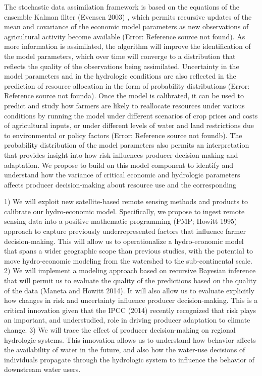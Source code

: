 The stochastic data assimilation framework is based on the equations of the ensemble Kalman filter (Evensen 2003) , which permits recursive updates of the mean and covariance of the economic model parameters as new observations of agricultural activity become available (Error: Reference source not found).  As more information is assimilated, the algorithm will improve the identification of the model parameters, which over time will converge to a distribution that reflects the quality of the observations being assimilated. Uncertainty in the model parameters and in the hydrologic conditions are also reflected in the prediction of resource allocation in the form of probability distributions (Error: Reference source not founda). Once the model is calibrated, it can be used to predict and study how farmers are likely to reallocate resources under various conditions by running the model under different scenarios of crop prices and costs of agricultural inputs, or under different levels of water and land restrictions due to environmental or policy factors (Error: Reference source not foundb). The probability distribution of the model parameters also permits an interpretation that provides insight into how risk influences producer decision-making and adaptation. We propose to build on this model component to identify and understand how the variance of critical economic and hydrologic parameters affects producer decision-making about resource use and the corresponding



1) We will exploit new satellite-based remote sensing methods and products to calibrate our hydro-economic model. Specifically, we propose to ingest remote sensing data into a positive mathematic programming (PMP; Howitt 1995) approach to capture previously underrepresented factors that influence farmer decision-making. This will allow us to operationalize a hydro-economic model that spans a wider geographic scope than previous studies, with the potential to move hydro-economic modeling from the watershed to the sub-continental scale. 
2) We will implement a modeling approach based on recursive Bayesian inference that will permit us to evaluate the quality of the predictions based on the quality of the data (Maneta and Howitt 2014). It will also allow us to evaluate explicitly how changes in risk and uncertainty influence producer decision-making. This is a critical innovation given that the IPCC (2014) recently recognized that risk plays an important, and understudied, role in driving producer adaptation to climate change. 
3) We will trace the effect of producer decision-making on regional hydrologic systems. This innovation allows us to understand how behavior affects the availability of water in the future, and also how the water-use decisions of individuals propagate through the hydrologic system to influence the behavior of downstream water users. 


